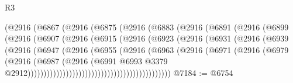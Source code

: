 \begin{lexlean}{R3}
\begin{coremodule}
                          (@2916
                            (@6867
                              (@2916
                                (@6875
                                  (@2916
                                    (@6883
                                      (@2916
                                        (@6891
                                          (@2916
                                            (@6899
                                              (@2916
                                                (@6907
                                                  (@2916
                                                    (@6915
                                                      (@2916
                                                        (@6923
                                                          (@2916
                                                            (@6931
                                                              (@2916
                                                                (@6939
                                                                  (@2916
                                                                    (@6947
                                                                      (@2916
                                                                        (@6955
                                                                          (@2916
                                                                            (@6963
                                                                              (@2916
                                                                                (@6971
                                                                                  (@2916
                                                                                    (@6979
                                                                                      (@2916
                                                                                        (@6987
                                                                                          (@2916
                                                                                            (@6991
                                                                                              @6993
                                                                                              @3379
                                                                                              @2912)))))))))))))))))))))))))))))))))))))))))))))
@7184 := @6754

\end{coremodule}
\end{lexlean}
